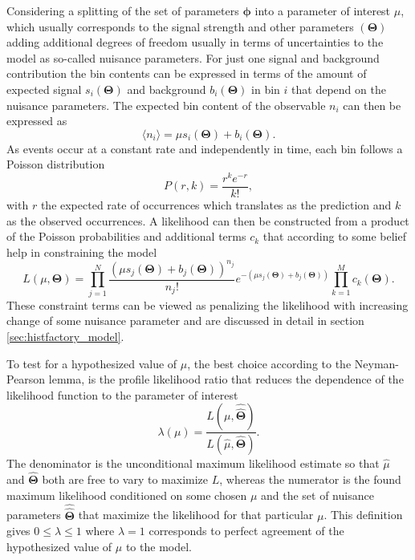 Considering a splitting of the set of parameters $\bm{\phi}$ into a parameter of interest $\mu$, which usually corresponds to the signal strength and other parameters $(\bm{\Theta})$ adding additional degrees of freedom usually in terms of uncertainties to the model as so-called nuisance parameters. For just one signal and background contribution the bin contents can be expressed in terms of the amount of expected signal $s_i(\bm{\Theta})$ and background $b_i(\bm{\Theta})$ in bin $i$ that depend on the nuisance parameters. The expected bin content of the observable $n_i$ can then be expressed as
\begin{equation} \label{eq:n_i}
    \langle n_i\rangle = \mu s_i(\bm{\Theta}) +b_i(\bm{\Theta}).
\end{equation}
As events occur at a constant rate and independently in time, each bin follows a Poisson distribution
\begin{equation}\label{eq:poisson}
    P(r,k)=\frac{r^k e^{-r}}{k!},
\end{equation}
with $r$ the expected rate of occurrences which translates as the prediction and $k$ as the observed occurrences. A likelihood can then be constructed from a product of the Poisson probabilities and additional terms $c_k$ that according to some belief help in constraining the model
\begin{equation}\label{eq:likelihood}
    L(\mu,\bm{\Theta})=
    \prod_{j=1}^N \frac{(\mu s_j(\bm{\Theta}) + b_j(\bm{\Theta}))^{n_j}}{n_j !} e^{-(\mu s_j(\bm{\Theta}) + b_j(\bm{\Theta}))}
    \prod_{k=1}^M c_k(\bm{\Theta}).
\end{equation}
These constraint terms can be viewed as penalizing the likelihood with increasing change of some nuisance parameter and are discussed in detail in section \ref{sec:histfactory_model}.

To test for a hypothesized value of $\mu$, the best choice according to the Neyman-Pearson lemma, is the profile likelihood ratio that reduces the dependence of the likelihood function to the parameter of interest
\begin{equation}\label{eq:likelihood_ratio}
    \lambda(\mu)=
    \frac{L(\mu,\hat{\hat{\bm{\Theta}}})}
    {L(\hat{\mu},\hat{\bm{\Theta}})}.
\end{equation}
The denominator is the unconditional maximum likelihood estimate so that $\hat{\mu}$ and $\hat{\bm{\Theta}}$ both are free to vary to maximize $L$, whereas the numerator is the found maximum likelihood conditioned on some chosen $\mu$ and the set of nuisance parameters $\hat{\hat{\bm{\Theta}}}$ that maximize the likelihood for that particular $\mu$. This definition gives $0 \leq \lambda \leq 1$ where $\lambda = 1$ corresponds to perfect agreement of the hypothesized value of $\mu$ to the model.

